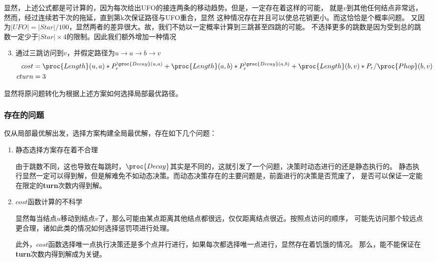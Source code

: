 \documentclass[hyperref,UTF8]{ctexart}
\theoremstyle{definition}
\theoremstyle{remark}
\numberwithin{equation}{subsection}
\newcommand{\Emph}{\textbf}
\begin{document}
	显然，上述公式都是可计算的，因为每次给出UFO的接连两条的移动趋势。但是，一定存在着这样的可能，
	就是$v$到其他任何结点非常远，然而，经过连续若干次的拖延，直到第k次保证路径与UFO重合，显然
	这种情况存在并且可以使总花销更小。而这恰恰是个概率问题。
	又因为$|UFO| = |Star|/100$，显然两者的差异很大。故，我们不妨以一定概率计算到三跳甚至四跳的可能。
	不选择更多的跳数是因为受到总的跳数一定少于$|Star| \times 4$的限制。因此我们额外增加一种情况
	\begin{enumerate}[(1)]
	\setcounter{enumi}{2}
		
		\item 通过三跳访问到$v$，并假定路径为$u \rightarrow a \rightarrow b \rightarrow v$
		\begin{align*}
			cost	&= \proc{Length}(u, a) * P_r^{\proc{Decay}(u, a)} + \proc{Length}(a, b) * P_r^{\proc{Decay}(a, b)} + \proc{Length}(b, v) * P_r / \proc{Phop}(b, v)	\\
			cturn	&= 3
		\end{align*}
		
	\end{enumerate}
	
	显然将原问题转化为根据上述方案如何选择局部最优路径。
	
\subsubsection{存在的问题}

	仅从局部最优解出发，选择方案构建全局最优解，存在如下几个问题：
	\begin{enumerate}[(1)]
		
		\item 静态选择方案存在着不合理
		
		由于跳数不同，这也导致在每跳时，$\proc{Decay}$其实是不同的，这就引发了一个问题，决策时动态进行的还是静态执行的。
		静态执行显然一定可以得到解，但是解难免不如动态决策。而动态决策存在的主要问题是，前面进行的决策是否荒废了，
		是否可以保证一定能在限定的\Emph{turn}次数内得到解。
		
		\item $cost$函数计算的不科学
		
		显然每当结点$u$移动到结点$v$了，那么可能由某点距离其他结点都很远，仅仅距离结点很近。按照点访问的顺序，
		可能先访问那个较远点更合理，诸如此类的情况如何选择惩罚项进行处理。
		
		此外，$cost$函数选择唯一点执行决策还是多个点并行进行，如果每次都选择唯一点进行，显然存在着饥饿的情况。
		那么，能不能保证在\Emph{turn}次数内得到解成为关键。
		
	\end{enumerate}
	
\end{document}
